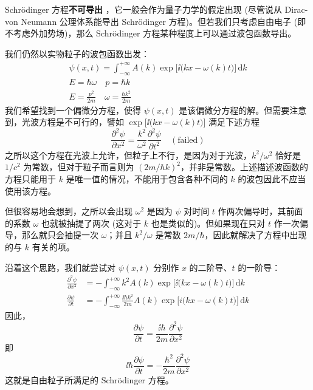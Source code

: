Schr\"odinger 方程\textbf{不可导出} ，它一般会作为量子力学的假定出现 (尽管说从 Dirac-von Neumann 公理体系能导出 Schr\"odinger 方程)。但若我们只考虑自由电子 (即不考虑外加势场)，那么 Schr\"odinger 方程某种程度上可以通过波包函数导出。

我们仍然以实物粒子的波包函数出发：
\begin{gather}
  \psi(x, t) = \int_{- \infty}^{+ \infty} A(k) \exp \big[ \ii \big( k x - \omega(k) t \big) \big] \, \mathrm{d} k \\
  E = \hbar \omega \quad p = \hbar k \\
  E = \frac{p^2}{2 m} \quad \omega = \frac{\hbar k^2}{2 m}
\end{gather}
我们希望找到一个偏微分方程，使得 $\psi(x, t)$ 是该偏微分方程的解。但需要注意到，光波方程是不可行的，譬如 $\exp \big[ \ii \big( k x - \omega(k) t \big) \big]$ 满足下述方程
\begin{equation}
\frac{\partial^2 \psi}{\partial x^2} = \frac{k^2}{\omega^2} \frac{\partial^2 \psi}{\partial t^2} \quad \mathrm{(failed)}
\end{equation}
之所以这个方程在光波上允许，但粒子上不行，是因为对于光波，$k^2/\omega^2$ 恰好是 $1/c^2$ 为常数，但对于粒子而言则为 $(2m/\hbar k)^2$，并非是常数。上述描述波函数的方程只能用于 $k$ 是唯一值的情况，不能用于包含各种不同的 $k$ 的波包因此不应当使用该方程。

但很容易地会想到，之所以会出现 $\omega^2$ 是因为 $\psi$ 对时间 $t$ 作两次偏导时，其前面的系数 $\omega$ 也就被抽提了两次 (这对于 $k$ 也是类似的)。但如果现在只对 $t$ 作一次偏导，那么就只会抽提一次 $\omega$；并且 $k^2 / \omega$ 是常数 $2m/\hbar$，因此就解决了方程中出现的与 $k$ 有关的项。

沿着这个思路，我们就尝试对 $\psi(x, t)$ 分别作 $x$ 的二阶导、$t$ 的一阶导：
\begin{align}
  \frac{\partial^2 \psi}{\partial x^2} &= - \int_{- \infty}^{+ \infty} k^2 A(k) \exp \big[ \ii \big( k x - \omega(k) t \big) \big] \, \mathrm{d} k \\
  \frac{\partial \psi}{\partial t} &= - \int_{- \infty}^{+ \infty} \frac{\ii \hbar k^2}{2 m} A(k) \exp \big[ i \big( k x - \omega(k) t \big) \big] \, \mathrm{d} k
\end{align}
因此，
\begin{equation}
\frac{\partial \psi}{\partial t} = \frac{\ii \hbar}{2 m} \frac{\partial^2 \psi}{\partial x^2}
\end{equation}
即
\begin{equation}
\ii \hbar \frac{\partial \psi}{\partial t} = - \frac{\hbar^2}{2 m} \frac{\partial^2 \psi}{\partial x^2}
\end{equation}
这就是自由粒子所满足的 Schr\"odinger 方程。


